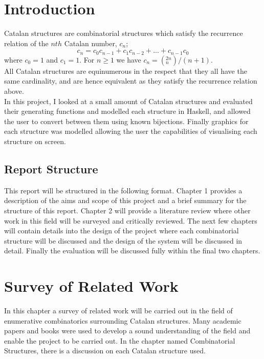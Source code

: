 \documentclass[12pt]{article}
\begin{document}
\section{Introduction}
Catalan structures are combinatorial structures which satisfy the recurrence relation of the $nth$ Catalan number, $c_n$;
\begin{equation}
c_{n} = c_{0}c_{n-1} + c_{1}c_{n-2} + ... + c_{n-1}c_{0}
\end{equation} 
where $c_0 = 1$ and $c_1 = 1$. For $n \geq 1$ we have $c_n = (^{2n}_{n})/(n+1)$. \cite{McShine_onThe}\\
All Catalan structures are equinumerous in the respect that they all have the same cardinality, and are hence equivalent as they satisfy the recurrence relation above.\\
In this project, I looked at a small amount of Catalan structures and evaluated their generating functions and modelled each structure in Haskell, and allowed the user to convert between them using known bijections. Finally graphics for each structure was modelled allowing the user the capabilities of visualising each structure on screen.

\subsection{Report Structure}
This report will be structured in the following format. Chapter 1 provides a description of the aims and scope of this project and a brief summary for the structure of this report. Chapter 2 will provide a literature review where other work in this field will be surveyed and critically reviewed. The next few chapters will contain details into the design of the project where each combinatorial structure will be discussed and the design of the system will be discussed in detail. Finally the evaluation will be discussed fully within the final two chapters.

\section{Survey of Related Work}
In this chapter a survey of related work will be carried out in the field of enumerative combinatorics surrounding Catalan structures. Many academic papers and books were used to develop a sound understanding of the field and enable the project to be carried out. In the chapter named Combinatorial Structures, there is a discussion on each Catalan structure used.\\
\end{document}
